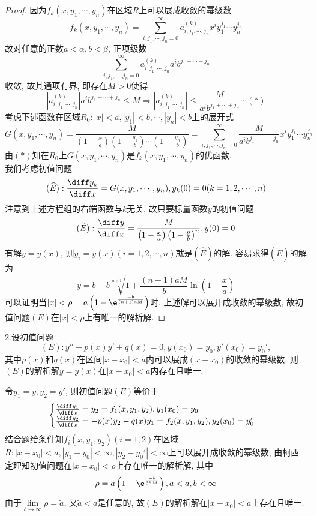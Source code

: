 \begin{proof}
因为$f_k(x,y_1,\cdots,y_n)$在区域$R$上可以展成收敛的幂级数
\[f_k(x,y_1,\cdots,y_n)=\sum_{i,j_1,\cdots,j_n=0}^{\infty}a_{i,j_1,\cdots,j_n}^{(k)}x^iy_1^{j_1}\cdots y_n^{j_n}\]
故对任意的正数$a<\alpha,b<\beta$, 正项级数
\[\sum_{i,j_1,\cdots,j_n=0}^{\infty}a_{i,j_1,\cdots,j_n}^{(k)}a^ib^{j_1+\cdots+j_n}\]
收敛, 故其通项有界, 即存在$M>0$使得
\[\left|a_{i,j_1,\cdots,j_n}^{(k)}\right|a^ib^{j_1+\cdots+j_n}\leq M\Rightarrow\left|a_{i,j_1,\cdots,j_n}^{(k)}\right|\leq\frac{M}{a^ib^{j_1+\cdots+j_n}}\cdots(*)\]
考虑下述函数在区域$R_0:|x|<a,|y_1|<b,\cdots,|y_n|<b$上的展开式
\[G(x,y_1,\cdots,y_n)=\frac{M}{\left(1-\frac{x}{a}\right)\left(1-\frac{y_1}{b}\right)\cdots\left(1-\frac{y_n}{b}\right)}=\sum_{i,j_1,\cdots,j_n=0}^{\infty}\frac{M}{a^ib^{j_1+\cdots+j_n}}x^iy_1^{j_1}\cdots y_n^{j_n}\]
由$(*)$知在$R_0$上$G(x,y_1,\cdots,y_n)$是$f_k(x,y_1,\cdots,y_n)$的优函数.\\
我们考虑初值问题
\[(\widehat{E}):\frac{\diff y_k}{\diff x}=G(x,y_1,\cdots,y_n),y_k(0)=0(k=1,2,\cdots,n)\]
注意到上述方程组的右端函数与$k$无关, 故只要标量函数$y$的初值问题
\[(\widetilde{E}):\frac{\diff y}{\diff x}=\frac{M}{\left(1-\frac{x}{a}\right)\left(1-\frac{y}{b}\right)^n},y(0)=0\]
有解$y=y(x)$, 则$y_i=y(x)(i=1,2,\cdots,n)$就是$(\widehat{E})$的解. 容易求得$(\widetilde{E})$的解为
\[y=b-b\sqrt[n+1]{1+\frac{(n+1)aM}{b}\ln\left(1-\frac{x}{a}\right)}\]
可以证明当$\displaystyle|x|<\rho=a\left(1-\e^{\frac{-b}{(n+1)aM}}\right)$时, 
上述解可以展开成收敛的幂级数, 故初值问题$(E)$在$|x|<\rho$上有唯一的解析解.
\end{proof}


2.设初值问题\[(E):y''+p(x)y'+q(x)=0,y(x_0)=y_0,y'(x_0)=y_0',\]
其中$p(x)$和$q(x)$在区间$|x-x_0|<a$内可以展成$(x-x_0)$的收敛的幂级数, 则$(E)$的解析解$y=y(x)$在$|x-x_0|<a$内存在且唯一.
\begin{solve} 
令$y_1=y,y_2=y'$, 则初值问题$(E)$等价于
\[\begin{cases}
\frac{\diff y_1}{\diff x}=y_2=f_1(x,y_1,y_2),y_1(x_0)=y_0\\
\frac{\diff y_2}{\diff x}=-p(x)y_2-q(x)y_1=f_2(x,y_1,y_2),y_2(x_0)=y_0'
\end{cases}\]
结合题给条件知$f_i(x,y_1,y_2)(i=1,2)$在区域$R:|x-x_0|<a,|y_1-y_0|<\infty,|y_2-y_0'|<\infty$上可以展开成收敛的幂级数, 由柯西定理知初值问题在$|x-x_0|<\rho$上存在唯一的解析解, 其中
\[\rho=\tilde{a}\left(1-\e^{\frac{-b}{3\tilde{a}M}}\right),\tilde{a}<a,b<\infty\]
由于$\lim\limits_{b\to\infty}\rho=\tilde{a}$, 又$\tilde{a}<a$是任意的, 故$(E)$的解析解在$|x-x_0|<a$上存在且唯一.
\end{solve}


